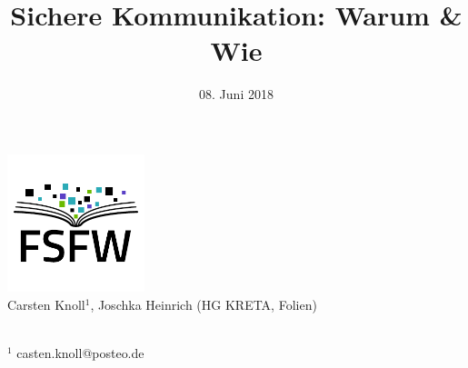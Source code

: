 \documentclass{beamer}
\title{Sichere Kommunikation: Warum \& Wie}
\subtitle{08. Juni 2018}
\begin{document}
\begin{frame}
  \begin{center}
      \includegraphics[width=4cm]{img-src/fsfw-logo-with-text.pdf}\\
      { \qquad Carsten Knoll${}^{1}$, Joschka Heinrich (HG KRETA, Folien)}

    \vspace*{2\baselineskip}

    \parbox{.95\columnwidth}{\centering\Large\inserttitle}

    \vspace*{\baselineskip}

    \structure{\large \insertsubtitle}

  \end{center}

  ~\\[5mm]
  { \tiny   ${}^1$   casten.knoll@posteo.de}
\end{frame}







\end{document}
